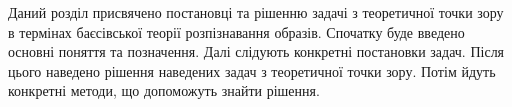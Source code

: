 Даний розділ присвячено постановці та рішенню задачі з теоретичної точки зору
в термінах баєсівської теорії розпізнавання образів.
Спочатку буде введено основні поняття та позначення.
Далі слідують конкретні постановки задач.
Після цього наведено рішення наведених задач з теоретичної точки зору.
Потім йдуть конкретні методи, що допоможуть знайти рішення.
